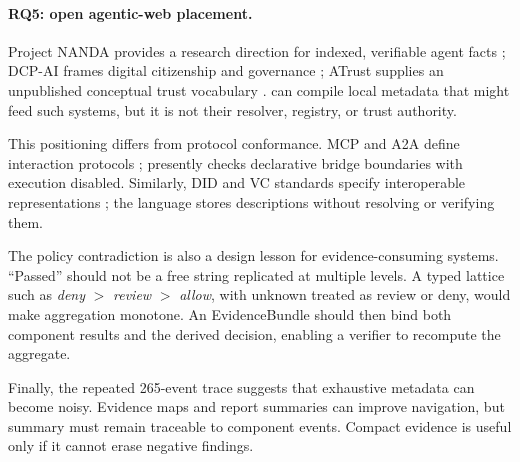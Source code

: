 \paragraph{RQ5: open agentic-web placement.}
Project NANDA provides a research direction for indexed, verifiable agent facts
\citep{projectnanda2026,raskar2025beyonddns}; DCP-AI frames digital citizenship
and governance \citep{naranjo_dcpai}; ATrust supplies an unpublished conceptual
trust vocabulary \citep{vazquez_atrust}.  \Argorix can compile local metadata
that might feed such systems, but it is not their resolver, registry, or trust
authority.

This positioning differs from protocol conformance.  MCP and A2A define
interaction protocols \citep{mcp_spec_2025,a2a_spec}; \Argorix presently checks
declarative bridge boundaries with execution disabled.  Similarly, DID and VC
standards specify interoperable representations
\citep{w3c_did_core_2022,w3c_vc_data_model_2025}; the language stores
descriptions without resolving or verifying them.

The policy contradiction is also a design lesson for evidence-consuming
systems.  ``Passed'' should not be a free string replicated at multiple
levels.  A typed lattice such as \emph{deny} $>$ \emph{review} $>$
\emph{allow}, with unknown treated as review or deny, would make aggregation
monotone.  An EvidenceBundle should then bind both component results and the
derived decision, enabling a verifier to recompute the aggregate.

Finally, the repeated 265-event trace suggests that exhaustive metadata can
become noisy.  Evidence maps and report summaries can improve navigation, but
summary must remain traceable to component events.  Compact evidence is useful
only if it cannot erase negative findings.
